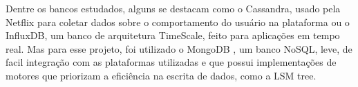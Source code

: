 Dentre os bancos estudados, alguns se destacam como o Cassandra, usado pela Netflix para coletar dados sobre o comportamento do usuário na plataforma ou o InfluxDB, um banco de arquitetura TimeScale, feito para aplicações em tempo real. Mas para esse projeto, foi utilizado o MongoDB \cite{mongodb}, um banco NoSQL, leve, de facil integração com as plataformas utilizadas e que possui implementações de motores que priorizam a eficiência na escrita de dados, como a LSM tree.




